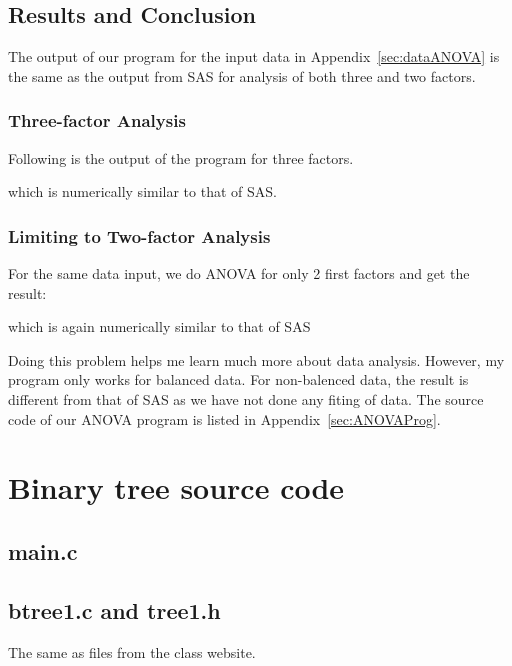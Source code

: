 \documentclass{article}
\begin{document}
\subsection{Results and Conclusion}
The output of our program for the input data in Appendix~\ref{sec:dataANOVA} is
the same as the output from SAS for analysis of both three and two factors.
\subsubsection{Three-factor Analysis}
Following is the output of the program for three factors.

which is numerically similar to that of SAS.
\subsubsection{Limiting to Two-factor Analysis}
For the same data input, we do ANOVA for only 2 first factors and get the
result:

which is again numerically similar to that of SAS

Doing this problem helps me learn much more about data analysis. However, my
program only works for balanced data. For non-balenced data, the result is
different from that of SAS as we have not done any fiting of data.
The source code of our ANOVA program is listed in Appendix~\ref{sec:ANOVAProg}.




\appendix
\section{Binary tree source code}\label{sec:bintreeCode}
\subsection{main.c}
\subsection{btree1.c and tree1.h}
The same as files from the class website.
\end{document}
